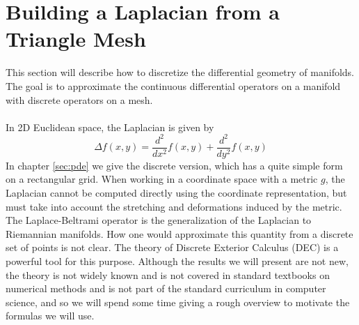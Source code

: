 \section*{Building a Laplacian from a Triangle Mesh}
This section will describe how to discretize the differential geometry of manifolds. The goal is to approximate the continuous differential operators on a manifold with discrete operators on a mesh.
\\\\
In 2D Euclidean space, the Laplacian is given by $$\Delta f(x, y) = \frac{d^2}{dx^2}f(x,y) + \frac{d^2}{dy^2}f(x,y)$$ In chapter \ref{sec:pde} we give the discrete version, which has a quite simple form on a rectangular grid. When working in a coordinate space with a metric $g$, the Laplacian cannot be computed directly using the coordinate representation, but must take into account the stretching and deformations induced by the metric. The Laplace-Beltrami operator is the generalization of the Laplacian to Riemannian manifolds.
How one would approximate this quantity from a discrete set of points is not clear. The theory of Discrete Exterior Calculus (DEC) is a powerful tool for this purpose. Although the results we will present are not new, the theory is not widely known and is not covered in standard textbooks on numerical methods and is not part of the standard curriculum in computer science, and so we will spend some time giving a rough overview to motivate the formulas we will use.

